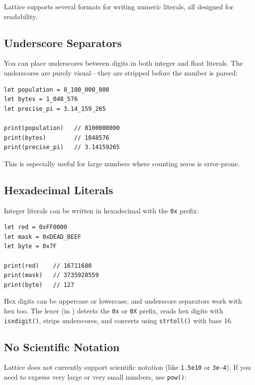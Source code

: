 Lattice supports several formats for writing numeric literals, all designed for readability.

\subsection{Underscore Separators}\label{subsec:underscores}

You can place underscores between digits in both integer and float literals.
The underscores are purely visual---they are stripped before the number is parsed:

\begin{lstlisting}[language=Lattice, caption={Underscore separators}]
let population = 8_100_000_000
let bytes = 1_048_576
let precise_pi = 3.14_159_265

print(population)   // 8100000000
print(bytes)        // 1048576
print(precise_pi)   // 3.14159265
\end{lstlisting}

This is especially useful for large numbers where counting zeros is error-prone.

\subsection{Hexadecimal Literals}\label{subsec:hex-literals}

Integer literals can be written in hexadecimal with the \lstinline|0x| prefix:

\begin{lstlisting}[language=Lattice, caption={Hexadecimal literals}]
let red = 0xFF0000
let mask = 0xDEAD_BEEF
let byte = 0x7F

print(red)    // 16711680
print(mask)   // 3735928559
print(byte)   // 127
\end{lstlisting}

Hex digits can be uppercase or lowercase, and underscore separators work with hex too.
The lexer (in ) detects the \lstinline|0x| or \lstinline|0X| prefix, reads hex digits with \lstinline|isxdigit()|, strips underscores, and converts using \lstinline|strtoll()| with base 16.

\subsection{No Scientific Notation}\label{subsec:no-scientific}

Lattice does not currently support scientific notation (like \lstinline|1.5e10| or \lstinline|3e-4|).
If you need to express very large or very small numbers, use \lstinline|pow()|:

